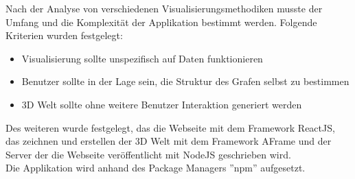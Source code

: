 
Nach der Analyse von verschiedenen Visualisierungsmethodiken musste der Umfang und die Komplexität der Applikation bestimmt werden.
Folgende Kriterien wurden festgelegt:
\begin{itemize}
    \item Visualisierung sollte unspezifisch auf Daten funktionieren
    \item Benutzer sollte in der Lage sein, die Struktur des Grafen selbst zu bestimmen
    \item 3D Welt sollte ohne weitere Benutzer Interaktion generiert werden
\end{itemize}
Des weiteren wurde festgelegt, das die Webseite mit dem Framework ReactJS, das zeichnen und erstellen der 3D Welt mit dem Framework
AFrame und der Server der die Webseite veröffentlicht mit NodeJS geschrieben wird. \\
Die Applikation wird anhand des Package Managers ''npm'' aufgesetzt.

